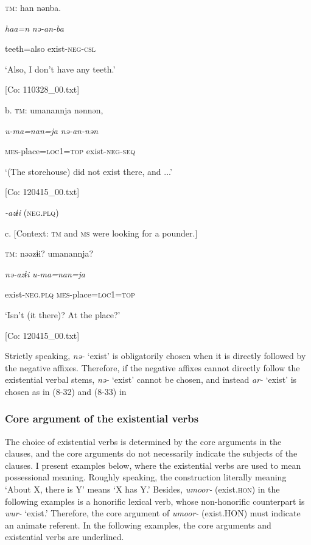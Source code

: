     \textsc{tm}:  han  nənba.

      \textit{haa=n}  \textit{nə-an{}-ba}

      teeth=also  exist-\textsc{neg}-\textsc{csl}

      ‘Also, I don’t have any teeth.’

      [Co: 110328\_00.txt]

  b.  \textsc{tm}:  umanannja  nənnən,

      \textit{u-ma=nan=ja}  \textit{nə-an{}-nən}

      \textsc{mes}-place=\textsc{loc}1=\textsc{top}  exist-\textsc{neg}-\textsc{seq}

      ‘(The storehouse) did not exist there, and ...’

      [Co: 120415\_00.txt]

  \textit{{}-azɨi} (\textsc{neg}.\textsc{plq})

  c.  [Context: \textsc{tm} and \textsc{ms} were looking for a pounder.]

    \textsc{tm}:  nəəzɨi?  umanannja?

      \textit{nə-azɨi}  \textit{u-ma=nan=ja}

      exist-\textsc{neg}.\textsc{plq}  \textsc{mes}-place=\textsc{loc}1=\textsc{top}

      ‘Isn’t (it there)? At the place?’

      [Co: 120415\_00.txt]

Strictly speaking, \textit{nə-} ‘exist’ is obligatorily chosen when it is directly followed by the negative affixes. Therefore, if the negative affixes cannot directly follow the existential verbal stems, \textit{nə-} ‘exist’ cannot be chosen, and instead \textit{ar-} ‘exist’ is chosen as in (8-32) and (8-33) in 

\subsubsection{Core argument of the existential verbs}

The choice of existential verbs is determined by the core arguments in the clauses, and the core arguments do not necessarily indicate the subjects of the clauses. I present examples below, where the existential verbs are used to mean possessional meaning. Roughly speaking, the construction literally meaning ‘About X, there is Y’ means ‘X has Y.’ Besides, \textit{umoor-} (exist.\textsc{hon}) in the following examples is a honorific lexical verb, whose non-honorific counterpart is \textit{wur-} ‘exist.’ Therefore, the core argument of \textit{umoor-} (exist.HON) must indicate an animate referent. In the following examples, the core arguments and existential verbs are underlined.

